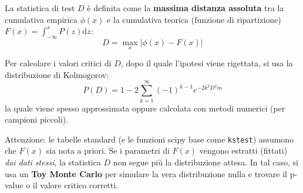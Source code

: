 \documentclass[openany,a4paper,12pt]{book}
\theoremstyle{remark}
\begin{document}
La statistica di test $D$ è definita come la \textbf{massima distanza assoluta} tra la cumulativa empirica $\phi(x)$ e la cumulativa teorica (funzione di ripartizione) $F(x) = \int_{-\infty}^{x} P(z) \mathrm{d}z$:
\begin{equation}
    D = \max_x |\phi(x) - F(x)|
\end{equation}

\begin{center}
\end{center}

Per calcolare i valori critici di $D$, dopo il quale l'ipotesi viene rigettata, si usa la distribuzione di Kolmogorov:
\begin{equation}
    P(D) = 1 - 2\sum_{k=1}^{\infty} (-1)^{k-1} e^{-2k^2 D^2 m}
\end{equation}
la quale viene spesso approssimata oppure calcolata con metodi numerici (per campioni piccoli).
\begin{nota}
    Attenzione: le tabelle standard (e le funzioni scipy base come \texttt{kstest}) assumono che $F(x)$ sia nota a priori. Se i parametri di $F(x)$ vengono estratti (fittati) \textit{dai dati stessi}, la statistica $D$ non segue più la distribuzione attesa. In tal caso, si usa un \textbf{Toy Monte Carlo} per simulare la vera distribuzione nulla e trovare il p-value o il valore critico corretti.
\end{nota}
\end{document}
